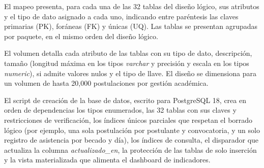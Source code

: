 \label{sec:cap7_mapeo}
El mapeo presenta, para cada una de las 32 tablas del diseño lógico, sus atributos y el tipo de dato asignado a cada uno, indicando entre paréntesis las claves primarias (PK), foráneas (FK) y únicas (UQ). Las tablas se presentan agrupadas por paquete, en el mismo orden del diseño lógico.



\label{sec:cap7_datos_fisico}

\label{sec:cap7_volumen}
El volumen detalla cada atributo de las tablas con su tipo de dato, descripción, tamaño (longitud máxima en los tipos \textit{varchar} y precisión y escala en los tipos \textit{numeric}), si admite valores nulos y el tipo de llave. El diseño se dimensiona para un volumen de hasta 20,000 postulaciones por gestión académica.



\label{sec:cap7_script}
El script de creación de la base de datos, escrito para PostgreSQL 18, crea en orden de dependencias los tipos enumerados, las 32 tablas con sus claves y restricciones de verificación, los índices únicos parciales que respetan el borrado lógico (por ejemplo, una sola postulación por postulante y convocatoria, y un solo registro de asistencia por becado y día), los índices de consulta, el disparador que actualiza la columna \textit{actualizado\_en}, la protección de las tablas de solo inserción y la vista materializada que alimenta el dashboard de indicadores.


